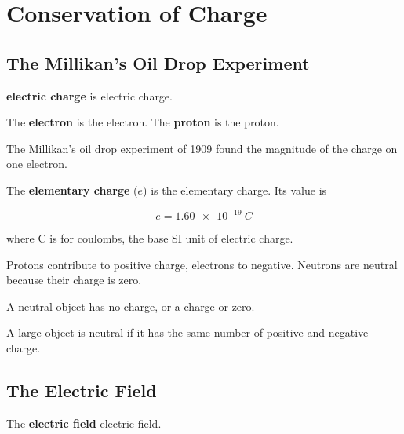 \documentclass[dvipsnames]{article}
\newif\ifShowUnitXI
\begin{document}
\fi

\clearpage

\section{Conservation of Charge}

\ifShowUnitXI


\subsection{The Millikan's Oil Drop Experiment}

\textbf{\Gls{electric charge}} is \glsdesc{electric charge}.

The \textbf{\gls{electron}} is the \glsdesc{electron}. The \textbf{\gls{proton}} is the \glsdesc{proton}.

The Millikan's oil drop experiment of 1909 found the magnitude of the charge on one electron. 

The \textbf{\gls{elementary charge}} ($e$) is the \glsdesc{elementary charge}. Its value is

\begin{equation*}
    e = \SI{1.60e-19}{C}
\end{equation*}

where C is for coulombs, the base SI unit of electric charge.

Protons contribute to positive charge, electrons to negative. Neutrons are neutral because their charge is zero. 


A neutral object has no charge, or a charge or zero.

A large object is neutral if it has the same number of positive and negative charge.

\subsection{The Electric Field}

The \textbf{\gls{electric field}} \glsdesc{electric field}.
\end{document}
